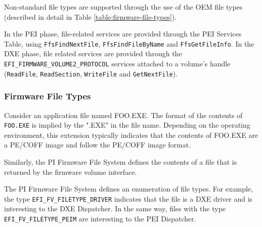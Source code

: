 Non-standard file types are supported through the use of the OEM file types (described in detail in Table \ref{table:firmware-file-types}).

In the PEI phase, file-related services are provided through the PEI Services Table, using \verb|FfsFindNextFile|, \verb|FfsFindFileByName| and \verb|FfsGetFileInfo|. In the DXE phase, file related services are provided through the \\ \verb|EFI_FIRMWARE_VOLUME2_PROTOCOL| services attached to a volume's handle (\verb|ReadFile|, \verb|ReadSection|, \verb|WriteFile| and \verb|GetNextFile|).

\subsubsection{Firmware File Types}
Consider an application file named FOO.EXE. The format of the contents of \verb|FOO.EXE| is implied by the ".EXE" in the file name. Depending on the operating environment, this extension typically indicates that the contents of FOO.EXE are a PE/COFF image and follow the PE/COFF image format.

Similarly, the PI Firmware File System defines the contents of a file that is returned by the firmware volume interface.

The PI Firmware File System defines an enumeration of file types. For example, the type
\verb|EFI_FV_FILETYPE_DRIVER| indicates that the file is a DXE driver and is interesting to the DXE
Dispatcher. In the same way, files with the type \verb|EFI_FV_FILETYPE_PEIM| are interesting to the
PEI Dispatcher.

